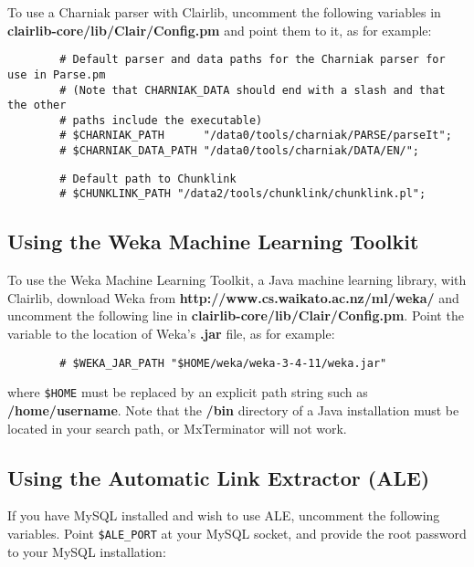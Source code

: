 To use a Charniak parser with Clairlib, uncomment the following variables in \textbf{clairlib-core/lib/Clair/Config.pm} and point them to it, as for example:

\begin{verbatim}
        # Default parser and data paths for the Charniak parser for use in Parse.pm
        # (Note that CHARNIAK_DATA should end with a slash and that the other
        # paths include the executable)
        # $CHARNIAK_PATH      "/data0/tools/charniak/PARSE/parseIt";
        # $CHARNIAK_DATA_PATH "/data0/tools/charniak/DATA/EN/";
\end{verbatim}
\begin{verbatim}
        # Default path to Chunklink
        # $CHUNKLINK_PATH "/data2/tools/chunklink/chunklink.pl";
\end{verbatim}
\subsection*{Using the Weka Machine Learning Toolkit\label{Using_the_Weka_Machine_Learning_Toolkit}}


To use the Weka Machine Learning Toolkit, a Java machine learning library, with Clairlib, download Weka from \textbf{\textsf{http://www.cs.waikato.ac.nz/ml/weka/}} and uncomment the following line in \textbf{clairlib-core/lib/Clair/Config.pm}. Point the variable to the location of Weka's \textbf{.jar} file, as for example:

\begin{verbatim}
        # $WEKA_JAR_PATH "$HOME/weka/weka-3-4-11/weka.jar"
\end{verbatim}


where \texttt{\$HOME} must be replaced by an explicit path string such as \textbf{/home/username}. Note that the \textbf{/bin} directory of a Java installation must be located in your search path, or MxTerminator will not work.

\subsection*{Using the Automatic Link Extractor (ALE)\label{Using_the_Automatic_Link_Extractor_ALE_}}


If you have MySQL installed and wish to use ALE, uncomment the following variables. Point \texttt{\$ALE\_PORT} at your MySQL socket, and provide the root password to your MySQL installation:

